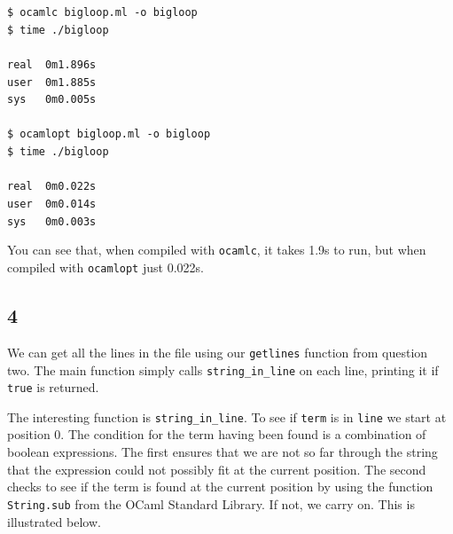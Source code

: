 \documentclass[]{book}
\newcommand{\smspace}{\vspace{4mm}}
\begin{document}
\smspace
\noindent\texttt{\$ ocamlc bigloop.ml -o bigloop}\\
\texttt{\$ time ./bigloop}\\
\\
\texttt{real\ \ 0m1.896s}\\
\texttt{user\ \ 0m1.885s}\\
\texttt{sys\ \ \ 0m0.005s}\\
\\
\texttt{\$ ocamlopt bigloop.ml -o bigloop}\\
\texttt{\$ time ./bigloop}\\
\\
\texttt{real\ \ 0m0.022s}\\
\texttt{user\ \ 0m0.014s}\\
\texttt{sys\ \ \ 0m0.003s}\vphantom{g}
\smspace

\noindent You can see that, when compiled with \texttt{ocamlc}, it takes 1.9s to run, but when compiled with \texttt{ocamlopt} just 0.022s.

\subsection*{4}
We can get all the lines in the file using our \texttt{getlines} function from question two. The main function simply calls \texttt{string\_in\_line} on each line, printing it if \texttt{true} is returned.

The interesting function is \texttt{string\_in\_line}. To see if \texttt{term} is in \texttt{line} we start at position 0. The condition for the term having been found is a combination of boolean expressions. The first ensures that we are not so far through the string that the expression could not possibly fit at the current position. The second checks to see if the term is found at the current position by using the function \texttt{String.sub} from the OCaml Standard Library. If not, we carry on. This is illustrated below.
\end{document}
